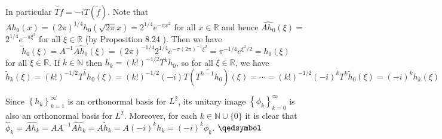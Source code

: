 \documentclass[lang=en,11pt,a4paper,citestyle =authoryear]{elegantpaper}
\newcommand{\prvd}{$\hfill \qedsymbol$}
\begin{document}
In particular $\widetilde{T f}=-i T(\widetilde{f})$. Note that $A h_{0}(x)=(2 \pi)^{1 / 4} h_{0}(\sqrt{2 \pi} x)=2^{1 / 4} e^{-\pi x^{2}}$ for all $x \in \mathbb{R}$ and hence $\widehat{A h_{0}}(\xi)=$ $2^{1 / 4} e^{-\pi \xi^{2}}$ for all $\xi \in \mathbb{R}$ (by Proposition 8.24 ). Then we have
\[
\widetilde{h}_{0}(\xi)=A^{-1} \widehat{A h_{0}}(\xi)=(2 \pi)^{-1 / 4} 2^{1 / 4} e^{-\pi(2 \pi)^{-1} \xi^{2}}=\pi^{-1 / 4} e^{\xi^{2} / 2}=h_{0}(\xi)
\]
for all $\xi \in \mathbb{R}$. If $k \in \mathbb{N}$ then $h_{k}=(k !)^{-1 / 2} T^{k} h_{0}$, so for all $\xi \in \mathbb{R}$, we have
\[
\widetilde{h}_{k}(\xi)=(k !)^{-1 / 2} \widetilde{T^{k} h_{0}}(\xi)=(k !)^{-1 / 2}(-i) T\left(\widetilde{T^{k-1} h_{0}}\right)(\xi)=\cdots=(k !)^{-1 / 2}(-i)^{k} T^{k} \widetilde{h}_{0}(\xi)=(-i)^{k} h_{k}(\xi)
\]\par
Since $\left\{h_{k}\right\}_{k=1}^{\infty}$ is an orthonormal basis for $L^{2}$, its unitary image $\left\{\phi_{k}\right\}_{k=0}^{\infty}$ is also an orthonormal basis for $L^{2}$. Moreover, for each $k \in \mathbb{N} \cup\{0\}$ it is clear that $\widehat{\phi}_{k}=\widehat{A h_{k}}=A A^{-1} \widehat{A h_{k}}=A \widetilde{h}_{k}=A(-i)^{k} h_{k}=(-i)^{k} \phi_{k}$.
\prvd
\vspace{0.5em}


\addappheadtotoc
\end{document}
